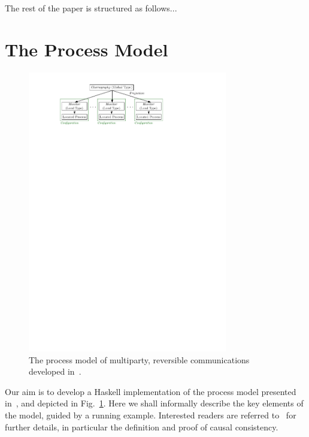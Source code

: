\documentclass[runningheads,plain]{llncs}
\begin{document}
The rest of the paper is structured as follows...

\section{The Process Model}
\label{the-process-model}

\begin{figure}[!t]
\begin{center}
    \includegraphics[width=8.7cm]{./img/figmodel.pdf}
\end{center}
\vspace{-4mm}
\caption{The process model of multiparty, reversible communications developed in~\cite{DBLP:conf/ppdp/MezzinaP17}.}\label{f:model}
\end{figure}

Our aim is to develop a Haskell implementation of the process model presented in~\cite{DBLP:conf/ppdp/MezzinaP17}, and depicted in Fig.~\ref{f:model}. 
Here we shall  informally describe the key elements of the model, guided by a running example. Interested readers are referred to~\cite{DBLP:conf/ppdp/MezzinaP17} for further details, in particular the definition and proof of causal consistency. 
\end{document}
